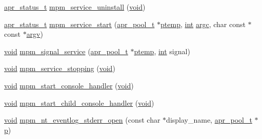 \begin{DoxyCompactItemize}
\item 
\hyperlink{group__apr__errno_gaa5105fa83cc322f09382292db8b47593}{apr\+\_\+status\+\_\+t} \hyperlink{group__APACHE__MPM__WINNT_gab182cbbb9878e40ba894b20aac2e124d}{mpm\+\_\+service\+\_\+uninstall} (\hyperlink{group__MOD__ISAPI_gacd6cdbf73df3d9eed42fa493d9b621a6}{void})
\item 
\hyperlink{group__apr__errno_gaa5105fa83cc322f09382292db8b47593}{apr\+\_\+status\+\_\+t} \hyperlink{group__APACHE__MPM__WINNT_ga2b4381675e212e8c90832138df293c99}{mpm\+\_\+service\+\_\+start} (\hyperlink{structapr__pool__t}{apr\+\_\+pool\+\_\+t} $\ast$\hyperlink{group__APACHE__CORE__CONFIG_ga276c3069e6bb618213a277e21f6f269e}{ptemp}, \hyperlink{pcre_8txt_a42dfa4ff673c82d8efe7144098fbc198}{int} \hyperlink{group__apr__getopt_ga6bdebf9385dc069c90aa21989641be02}{argc}, char const $\ast$const $\ast$\hyperlink{group__apr__getopt_ga675a108e956f4e2ea74dae8d26e6273e}{argv})
\item 
\hyperlink{group__MOD__ISAPI_gacd6cdbf73df3d9eed42fa493d9b621a6}{void} \hyperlink{group__APACHE__MPM__WINNT_ga7a889e21efeb00ca2cb61adb83020f0b}{mpm\+\_\+signal\+\_\+service} (\hyperlink{structapr__pool__t}{apr\+\_\+pool\+\_\+t} $\ast$\hyperlink{group__APACHE__CORE__CONFIG_ga276c3069e6bb618213a277e21f6f269e}{ptemp}, \hyperlink{pcre_8txt_a42dfa4ff673c82d8efe7144098fbc198}{int} signal)
\item 
\hyperlink{group__MOD__ISAPI_gacd6cdbf73df3d9eed42fa493d9b621a6}{void} \hyperlink{group__APACHE__MPM__WINNT_gaa7b01f4098e1a8b072f6c71233deecc9}{mpm\+\_\+service\+\_\+stopping} (\hyperlink{group__MOD__ISAPI_gacd6cdbf73df3d9eed42fa493d9b621a6}{void})
\item 
\hyperlink{group__MOD__ISAPI_gacd6cdbf73df3d9eed42fa493d9b621a6}{void} \hyperlink{group__APACHE__MPM__WINNT_ga86f4bf4459737baadaec24139c92ef4c}{mpm\+\_\+start\+\_\+console\+\_\+handler} (\hyperlink{group__MOD__ISAPI_gacd6cdbf73df3d9eed42fa493d9b621a6}{void})
\item 
\hyperlink{group__MOD__ISAPI_gacd6cdbf73df3d9eed42fa493d9b621a6}{void} \hyperlink{group__APACHE__MPM__WINNT_ga2943e6613864254a13b50d10c6f139ff}{mpm\+\_\+start\+\_\+child\+\_\+console\+\_\+handler} (\hyperlink{group__MOD__ISAPI_gacd6cdbf73df3d9eed42fa493d9b621a6}{void})
\item 
\hyperlink{group__MOD__ISAPI_gacd6cdbf73df3d9eed42fa493d9b621a6}{void} \hyperlink{group__APACHE__MPM__WINNT_ga67a7baf6783d8eb179a221a0179adf29}{mpm\+\_\+nt\+\_\+eventlog\+\_\+stderr\+\_\+open} (const char $\ast$display\+\_\+name, \hyperlink{structapr__pool__t}{apr\+\_\+pool\+\_\+t} $\ast$\hyperlink{group__APACHE__CORE__MPM_ga5cd91701e5c167f2b1a38e70ab57817e}{p})

\end{DoxyCompactItemize}
